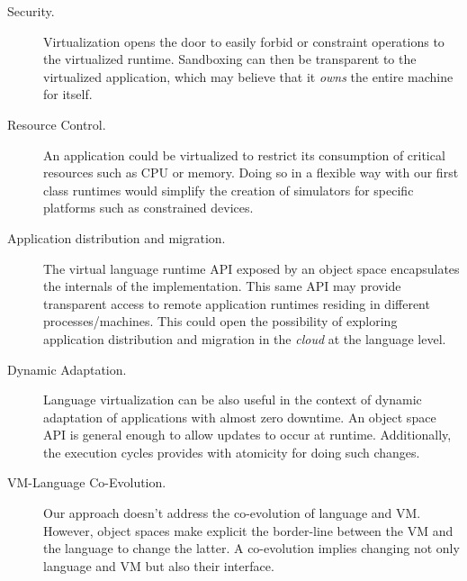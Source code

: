 \begin{description}

\item[Security.] Virtualization opens the door to easily forbid or constraint operations to the virtualized runtime. Sandboxing can then be transparent to the virtualized application, which may believe that it \emph{owns} the entire machine for itself.

\item[Resource Control.] An application could be virtualized to restrict its consumption of critical resources such as CPU or memory. Doing so in a flexible way with our first class runtimes would simplify \eg the creation of simulators for specific platforms such as constrained devices.

\item[Application distribution and migration.] The virtual language runtime API exposed by an object space encapsulates the internals of the implementation. This same API may provide transparent access to remote application runtimes residing in different processes/machines. This could open the possibility of exploring application distribution and migration in the \emph{cloud} at the language level.

\item[Dynamic Adaptation.] Language virtualization can be also useful in the context of dynamic adaptation of applications with almost zero downtime. An object space API is general enough to allow updates to occur at runtime. Additionally, the execution cycles provides with atomicity for doing such changes.

\item[VM-Language Co-Evolution.] Our approach doesn't address the co-evolution of language and VM. However, object spaces make explicit the border-line between the VM and the language to change the latter. A co-evolution implies changing not only language and VM but also their interface.

\end{description}

